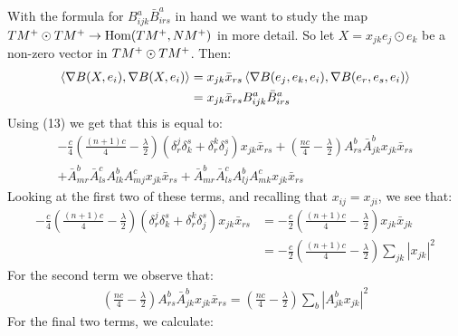 With the formula for $B^a_{ijk} \bar{B}^a_{irs}$ in hand we want to study the map $TM^{+} \odot TM^{+} \rightarrow \text{Hom}( TM^{+}, NM^+ )$ in more detail.  So let $X = x_{jk} e_j \odot e_k$ be a non-zero vector in $TM^{+} \odot TM^{+}$. Then:
%
\begin{align*}
\left\langle \nabla B (X, e_i), \nabla B(X, e_i) \right\rangle &=  x_{jk} \bar{x}_{rs} \left\langle \nabla B(e_j, e_k, e_i), \nabla B(e_r, e_s, e_i) \right\rangle \\
&= x_{jk} \bar{x}_{rs} B^a_{ijk} \bar{B}^a_{irs}
\end{align*}
%
Using (13) we get that this is equal to:
%
\begin{align*}
- \frac{c}{4} \left( \frac{(n+1)c}{4} - \frac{\lambda}{2} \right)\left( \delta^j_r \delta^s_k + \delta^k_r \delta^s_j \right) x_{jk} \bar{x}_{rs} + \left( \frac{nc}{4} - \frac{\lambda}{2} \right) A^b_{rs} \bar{A}^b_{jk} x_{jk} \bar{x}_{rs} \\
+ \bar{A}^b_{mr} \bar{A}^c_{ls} A^b_{lk} A^c_{mj} x_{jk} \bar{x}_{rs} + \bar{A}^b_{mr} \bar{A}^c_{ls} A^b_{lj} A^c_{mk} x_{jk} \bar{x}_{rs}
\end{align*}
%
Looking at the first two of these terms, and recalling that $x_{ij} = x_{ji}$, we see that:
%
\begin{align*}
- \frac{c}{4} \left( \frac{(n+1)c}{4} - \frac{\lambda}{2} \right) \left( \delta^j_r \delta^s_k + \delta^k_r \delta^s_j \right) x_{jk} \bar{x}_{rs} &= - \frac{c}{2} \left( \frac{(n+1)c}{4} - \frac{\lambda}{2} \right) x_{jk} \bar{x}_{jk} \\
&= - \frac{c}{2} \left( \frac{(n+1)c}{4} - \frac{\lambda}{2} \right) \sum_{jk} \left| x_{jk} \right|^2
\end{align*}
%
For the second term we observe that:
%
\begin{align*}
\left( \frac{nc}{4} - \frac{\lambda}{2} \right) A^b_{rs} \bar{A}^b_{jk} x_{jk} \bar{x}_{rs} = \left( \frac{nc}{4} - \frac{\lambda}{2} \right) \sum_{b} \left| A^b_{jk} x_{jk} \right|^2
\end{align*}
%
For the final two terms, we calculate:
%
